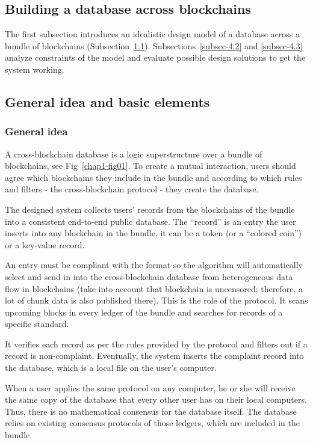\begin{multicols}{2}
\section{Building a database across blockchains}\label{sec-4}

The first subsection introduces an idealistic design model of a database across a bundle of blockchains (Subsection~\ref{subsec-4.1}). Subsections~\ref{subsec-4.2} and \ref{subsec-4.3} analyze constraints of the model and evaluate possible design solutions to get the system working.

\subsection{General idea and basic elements}\label{subsec-4.1}

\subsubsection{General idea}\label{subsubsec-4.1.1}

A cross-blockchain database is a logic superstructure over a bundle of blockchains, see Fig~\ref{chap1-fig01}. To create a mutual interaction, users should agree which blockchains they include in the bundle and according to which rules and filters - the cross-blockchain protocol - they create the database.

The designed system collects users’ records from the blockchains of the bundle into a consistent end-to-end public database. The “record” is an entry the user inserts into any blockchain in the bundle, it can be a token (or a “colored coin”) or a key-value record.

An entry must be compliant with the format so the algorithm will automatically select and send in into the cross-blockchain database from heterogeneous data flow in blockchains (take into account that blockchain is uncensored; therefore, a lot of chunk data is also published there). This is the role of the protocol. It scans upcoming blocks in every ledger of the bundle and searches for records of a specific standard. 

It verifies each record as per the rules provided by the protocol and filters out if a record is non-complaint. Eventually, the system inserts the complaint record into the database, which is a local file on the user’s computer.

When a user applies the same protocol on any computer, he or she will receive the same copy of the database that every other user has on their local computers. Thus, there is no mathematical consensus for the database itself. The database relies on existing consensus protocols of those ledgers, which are included in the bundle. 


\end{multicols}
